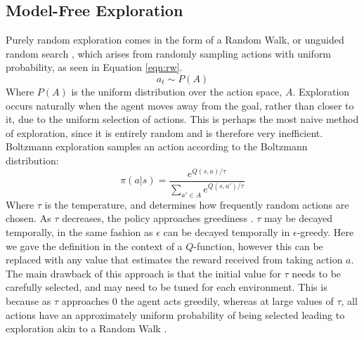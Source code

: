 \subsection{Model-Free Exploration}
Purely random exploration comes in the form of a Random Walk, or unguided random search \cite{anderson86}, which arises from randomly sampling actions with uniform probability, as seen in Equation \ref{eqn:rw}. 
\begin{equation}
\label{eqn:rw}
    a_t \sim P(A)
\end{equation}
Where $P(A)$ is the uniform distribution over the action space, $A$. Exploration occurs naturally when the agent moves away from the goal, rather than closer to it, due to the uniform selection of actions. This is perhaps the most naive method of exploration, since it is entirely random and is therefore very inefficient.
\\ Boltzmann exploration samples an action according to the Boltzmann distribution:
\begin{equation}
\label{eqn:boltzmann}
\pi(a|s) = \frac{e^{Q(s,a)/\tau}}{\sum_{a' \in A}e^{Q(s,a')/\tau}}
\end{equation}
Where $\tau$ is the temperature, and determines how frequently random actions are chosen. As $\tau$ decreases, the policy approaches greediness \cite{DBLP:journals/corr/cs-AI-9605103, DBLP:journals/corr/abs-2109-00157}. $\tau$ may be decayed temporally, in the same fashion as $\epsilon$ can be decayed temporally in $\epsilon$-greedy. Here we gave the definition in the context of a $Q$-function, however this can be replaced with any value that estimates the reward received from taking action $a$. The main drawback of this approach is that the initial value for $\tau$ needs to be carefully selected, and may need to be tuned for each environment. This is because as $\tau$ approaches 0 the agent acts greedily, whereas at large values of $\tau$, all actions have an approximately uniform probability of being selected leading to exploration akin to a Random Walk \cite{DBLP:journals/corr/abs-2109-00157}.
